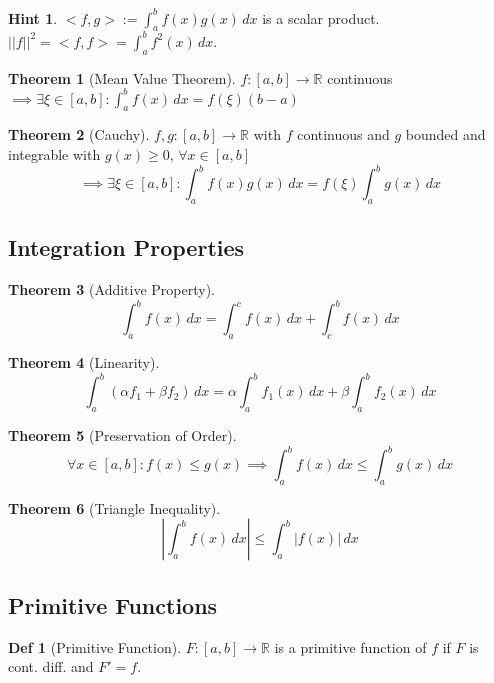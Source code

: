 \documentclass[a4paper, 10pt]{article}
\theoremstyle{definition}
\newtheorem*{definition}{Def}
\newtheorem*{note_wrapper}{Hint}
\theoremstyle{named}
\newtheorem*{ntheorem_wrapper}{Theorem}
\newenvironment{ntheorem}%
    {\begin{mdframed}[style=important]\begin{ntheorem_wrapper}}%
    {\end{ntheorem_wrapper}\end{mdframed}}
\newenvironment{note}%
    {\begin{mdframed}[style=trick]\begin{note_wrapper}}%
    {\end{note_wrapper}\end{mdframed}}
\newcommand{\R}{\mathbb{R}}
\begin{document}
\begin{note}
    $<f, g> := \int_a^b f(x)g(x) \,dx$ is a scalar product. \\
    $||f||^2 = <f, f> = \int_a^b f^2(x) \,dx$.
\end{note}

\begin{ntheorem}[Mean Value Theorem]
    $f: [a, b] \to \R$ continuous $\implies \exists \xi \in [a, b]: \int_a^b f(x) \,dx = f(\xi)(b - a)$
\end{ntheorem}

\begin{ntheorem}[Cauchy]
    $f, g: [a, b] \to \R$ with $f$ continuous and $g$ bounded and integrable with $g(x) \geq 0$, $\forall x \in [a, b]$
    $$\implies \exists \xi \in [a, b]: \int_a^b f(x)g(x) \,dx = f(\xi)\int_a^b g(x) \,dx$$
\end{ntheorem}

\subsection{Integration Properties}
\begin{ntheorem}[Additive Property]
    $$\int_a^b f(x) \,dx = \int_a^c f(x) \,dx + \int_c^b f(x) \,dx$$
\end{ntheorem}

\begin{ntheorem}[Linearity]
    $$\int_a^b(\alpha f_1 + \beta f_2) \,dx = \alpha \int_a^b f_1(x) \,dx + \beta \int_a^b f_2(x) \,dx$$
\end{ntheorem}

\begin{ntheorem}[Preservation of Order]
    $$\forall x \in [a, b]: f(x) \leq g(x) \implies \int_a^b f(x) \,dx \leq \int_a^b g(x) \,dx$$
\end{ntheorem}

\begin{ntheorem}[Triangle Inequality]
    $$\left|\int_a^b f(x) \,dx\right| \leq \int_a^b |f(x)| \,dx$$
\end{ntheorem}

\subsection{Primitive Functions}
\begin{definition}[Primitive Function]
    $F: [a, b] \to \R$ is a primitive function of $f$ if $F$ is cont. diff. and $F' = f$.
\end{definition}
\end{document}
